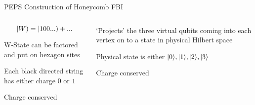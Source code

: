 \begin{block}{PEPS Construction of Honeycomb FBI}

\begin{columns}[T]
\begin{column}{0.5\textwidth}
\begin{figure}[h]
\end{figure}
$$\left |W \right ) = \left |100... \right )+...$$
\vskip-0.5cm
\bi 
\item W-State can be factored and put on hexagon sites
\item Each black directed string has either charge $0$ or $1$
\item Charge conserved
\ei 
\end{column}
\begin{column}{0.5\textwidth}
\begin{figure}[h]
\end{figure}
\vskip-0.3cm
\bi 
\item `Projects' the three virtual qubits coming into each vertex on to a state in physical Hilbert space
\item Physical state is either $\vert 0 \rangle, \vert 1 \rangle, \vert 2 \rangle, \vert 3 \rangle$
\item Charge conserved
\ei 
\end{column}
\end{columns}

\end{block}